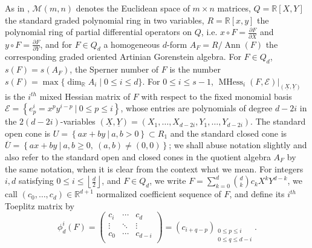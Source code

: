 \documentclass[unnumsec,webpdf,modern,medium]{oup-authoring-template}
\newcommand{\R}{\mathbb{R}}
\newcommand{\flo}[1]{\left\lfloor\frac{#1}{2}\right\rfloor}
\DeclareMathOperator{\Ann}{Ann}
\theoremstyle{theorem}
\theoremstyle{definition}
\begin{document}
As in \cite{MMS}, $\mathcal{M}(m,n)$ denotes the Euclidean space of $m\times n$ matrices, $Q=\R[X,Y]$ 
the standard graded polynomial ring in two variables,
$R=\R[x,y]$ the polynomial ring of partial differential operators on $Q$, i.e. $x\circ F=\frac{\partial F}{\partial X}$ and $y\circ F=\frac{\partial F}{\partial Y}$, and for $F\in Q_d$ a homogeneous $d$-form $A_F=R/\Ann(F)$ the corresponding graded oriented Artinian Gorenstein algebra.  
For $F\in Q_d$, $s(F)=s(A_F)$, the Sperner number of $F$ is the number $s(F) = \max\{\dim_\R A_i \mid  0 \leq i \leq d \}$. For $0\leq i\leq s-1$, $\operatorname{MHess}_i(F,\mathcal{E})|_{(\underline{X},\underline{Y})}$ is the $i^{th}$ mixed Hessian matrix of $F$ with respect to the fixed monomial basis $\mathcal{E}=\left\{e^i_p=x^py^{i-p} \ | \ 0\leq p\leq i\right\}$, whose entries are polynomials of degree $d-2i$ in the $2(d-2i)$-variables $(\underline{X},\underline{Y})=(X_1,\ldots,X_{d-2i},Y_1,\ldots,Y_{d-2i})$.
The standard open cone is $U=\left\{ax+by \ | \ a,b>0\right\}\subset R_1$ and the standard closed cone is 
\({\overline{U}=\left\{ax+by \ | \ a,b\geq 0, \ (a,b) \ne (0,0)\right\}}\); 
we shall abuse notation slightly and also refer to the standard open and closed cones in the quotient algebra $A_F$ by the same notation, when it is clear from the context what we mean.  For integers $i,d$ satisfying $0\leq i\leq \flo{d}$, and $F\in Q_d$, we write $F=\sum_{k=0}^d\binom{d}{k}c_kX^kY^{d-k}$, 
we call $(c_0,\ldots,c_d)\in\R^{d+1}$ normalized coefficient sequence of \(F\), 
and define its $i^{th}$ Toeplitz matrix by 
\[
\phi^i_d(F)=\begin{pmatrix}
c_i & \cdots & c_d\\
\vdots & \ddots & \vdots\\
c_0 & \cdots & c_{d-i} \\ 
\end{pmatrix}
=\left(c_{i+q-p}\right)_{\substack{0\leq p\leq i\\ 0\leq q\leq d-i\\}}.
\]
\end{document}
